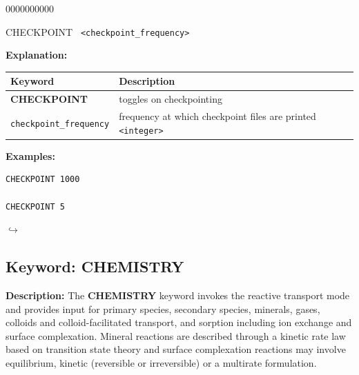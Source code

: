 \documentclass[12pt]{article}
\newcommand\return{{\hfill$\hookrightarrow$}}
\begin{document}
\begin{deflist}{0000000000}
\item [CHECKPOINT] \ {\tt <checkpoint\_frequency>}
\end{deflist}

{\noindent\bf Explanation:}

\begin{center}
\begin{tabularx}{\linewidth}{lX}
\toprule[1.5pt]
\bf Keyword & \bf Description\\
\midrule
\bf CHECKPOINT & toggles on checkpointing \\
{\tt checkpoint\_frequency} & frequency at which checkpoint files are printed {\tt<integer>} \\
\bottomrule
\end{tabularx}
\end{center}

\bigskip

{\noindent\bf Examples:}
\begin{verbatim}
CHECKPOINT 1000

CHECKPOINT 5
\end{verbatim}

\hyperlink{target_key}{\return}

\newpage
\protect\hypertarget{target_chem}{}

\subsection{Keyword: CHEMISTRY}

\noindent
{\bf Description:}
The {\bf CHEMISTRY} keyword invokes the reactive transport mode and provides input for primary species, secondary species, minerals, gases, colloids and colloid-facilitated transport, and sorption including ion exchange and surface complexation. Mineral reactions are described through a kinetic rate law based on transition state theory and surface complexation reactions may involve equilibrium, kinetic (reversible or irreversible) or a multirate formulation.


\end{document}
